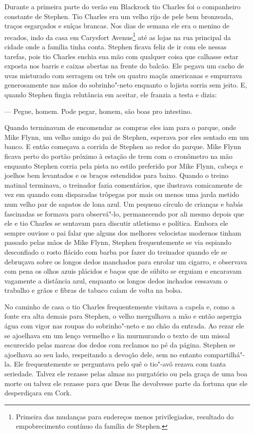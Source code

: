 Durante a primeira parte do verão em Blackrock tio Charles foi o
companheiro constante de Stephen. Tio Charles era um velho rijo de
pele bem bronzeada, traços esgarçados e suíças brancas. Nos dias de
semana ele era o menino de recados, indo da casa em Carysfort
Avenue\footnote{ Primeira das mudanças para endereços menos
privilegiados, resultado do empobrecimento contínuo da família de
Stephen.} até as lojas na rua principal da cidade onde a família tinha
conta. Stephen ficava feliz de ir com ele nessas tarefas, pois tio
Charles enchia sua mão com qualquer coisa que calhasse estar exposta
nos barris e caixas abertas na frente do balcão. Ele pegava um cacho de
uvas misturado com serragem		                                         
ou três ou quatro maçãs americanas e empurrava generosamente nas mãos
do sobrinho"-neto enquanto o lojista sorria sem jeito. E, quando Stephen
fingia relutância em aceitar, ele franzia a testa e dizia:

 --- Pegue, homem. Pode pegar, homem, são boas pro intestino.

Quando terminavam de encomendar as compras eles iam para o parque, onde
Mike Flynn, um velho amigo do pai de Stephen, esperava por eles sentado
em um banco. E então começava a corrida de Stephen ao redor do parque.
Mike Flynn ficava perto do portão próximo à estação de trem com o
cronômetro na mão enquanto Stephen corria pela pista no estilo
preferido por Mike Flynn, cabeça e joelhos bem levantados e os braços estendidos
para baixo. Quando o treino matinal terminava, o
treinador fazia comentários, que ilustrava comicamente de vez em quando
com disparadas trôpegas por mais ou menos uma jarda metido num velho
par de sapatos de lona azul. Um pequeno círculo de crianças e babás
fascinadas se formava para observá"-lo, permanecendo por ali mesmo
depois que ele e tio Charles se sentavam para discutir atletismo e
política. Embora ele sempre ouvisse o pai falar que alguns dos melhores
velocistas modernos tinham passado pelas mãos de Mike Flynn, Stephen
frequentemente se via espiando desconfiado o rosto flácido com barba
por fazer do treinador quando ele se debruçava sobre os longos dedos
manchados para enrolar um cigarro, e observava com pena os olhos azuis
plácidos e baços que de súbito se erguiam e encaravam vagamente a
distância azul, enquanto os longos dedos inchados cessavam o trabalho e
grãos e fibras de tabaco caíam de volta na bolsa.

No caminho de casa o tio Charles frequentemente visitava a capela e,
como a fonte era alta demais para Stephen, o velho mergulhava a mão e
então aspergia água com vigor nas roupas do sobrinho"-neto e no chão da
entrada. Ao rezar ele se ajoelhava em um lenço vermelho e lia
murmurando o texto de um missal escurecido pelas marcas dos dedos com reclamos no pé
da página. Stephen se ajoelhava ao seu lado, respeitando a devoção
dele, sem no entanto compartilhá"-la. Ele frequentemente se perguntava
pelo quê o tio"-avô rezava com tanta seriedade. Talvez ele rezasse pelas
almas no purgatório ou pela graça de uma boa morte ou talvez ele
rezasse para que Deus lhe devolvesse parte da fortuna que ele
desperdiçara em Cork.

